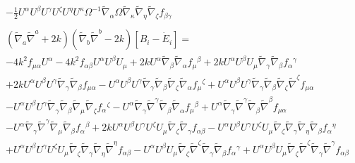 \documentclass[10pt,letterpaper]{article}
\numberwithin{equation}{section}
\begin{document}
\begin{eqnarray}
 && -  \tfrac{1}{2} U^{\alpha } U^{\beta } U^{\gamma } U^{\zeta } U^{\eta } U^{\kappa } \Omega^{-1} \tilde{\nabla}_{\alpha }\Omega \tilde{\nabla}_{\kappa }\tilde{\nabla}_{\eta }\tilde{\nabla}_{\zeta }f_{\beta \gamma }
\\ \nonumber\\
&&(\tilde\nabla_a\tilde\nabla^a +2 k)(\tilde\nabla_b\tilde\nabla^b-2k)[B_i -\dot E_i]=
\nonumber\\
&&-4 k^2 f_{\mu \alpha } U^{\alpha } - 4 k^2 f_{\alpha \beta } U^{\alpha } U^{\beta } U_{\mu } + 2 k U^{\alpha } \tilde{\nabla}_{\beta }\tilde{\nabla}_{\alpha }f_{\mu }{}^{\beta } + 2 k U^{\alpha } U^{\beta } U_{\mu } \tilde{\nabla}_{\gamma }\tilde{\nabla}_{\beta }f_{\alpha }{}^{\gamma } \nonumber \\ 
&& + 2 k U^{\alpha } U^{\beta } U^{\gamma } \tilde{\nabla}_{\gamma }\tilde{\nabla}_{\beta }f_{\mu \alpha } -  U^{\alpha } U^{\beta } U^{\gamma } \tilde{\nabla}_{\gamma }\tilde{\nabla}_{\beta }\tilde{\nabla}_{\zeta }\tilde{\nabla}_{\alpha }f_{\mu }{}^{\zeta } + U^{\alpha } U^{\beta } U^{\gamma } \tilde{\nabla}_{\gamma }\tilde{\nabla}_{\beta }\tilde{\nabla}_{\zeta }\tilde{\nabla}^{\zeta }f_{\mu \alpha } \nonumber \\ 
&& -  U^{\alpha } U^{\beta } U^{\gamma } \tilde{\nabla}_{\gamma }\tilde{\nabla}_{\beta }\tilde{\nabla}_{\mu }\tilde{\nabla}_{\zeta }f_{\alpha }{}^{\zeta } -  U^{\alpha } \tilde{\nabla}_{\gamma }\tilde{\nabla}^{\gamma }\tilde{\nabla}_{\beta }\tilde{\nabla}_{\alpha }f_{\mu }{}^{\beta } + U^{\alpha } \tilde{\nabla}_{\gamma }\tilde{\nabla}^{\gamma }\tilde{\nabla}_{\beta }\tilde{\nabla}^{\beta }f_{\mu \alpha } \nonumber \\ 
&& -  U^{\alpha } \tilde{\nabla}_{\gamma }\tilde{\nabla}^{\gamma }\tilde{\nabla}_{\mu }\tilde{\nabla}_{\beta }f_{\alpha }{}^{\beta } + 2 k U^{\alpha } U^{\beta } U^{\gamma } U^{\zeta } U_{\mu } \tilde{\nabla}_{\zeta }\tilde{\nabla}_{\gamma }f_{\alpha \beta } -  U^{\alpha } U^{\beta } U^{\gamma } U^{\zeta } U_{\mu } \tilde{\nabla}_{\zeta }\tilde{\nabla}_{\gamma }\tilde{\nabla}_{\eta }\tilde{\nabla}_{\beta }f_{\alpha }{}^{\eta } \nonumber \\ 
&& + U^{\alpha } U^{\beta } U^{\gamma } U^{\zeta } U_{\mu } \tilde{\nabla}_{\zeta }\tilde{\nabla}_{\gamma }\tilde{\nabla}_{\eta }\tilde{\nabla}^{\eta }f_{\alpha \beta } -  U^{\alpha } U^{\beta } U_{\mu } \tilde{\nabla}_{\zeta }\tilde{\nabla}^{\zeta }\tilde{\nabla}_{\gamma }\tilde{\nabla}_{\beta }f_{\alpha }{}^{\gamma } + U^{\alpha } U^{\beta } U_{\mu } \tilde{\nabla}_{\zeta }\tilde{\nabla}^{\zeta }\tilde{\nabla}_{\gamma }\tilde{\nabla}^{\gamma }f_{\alpha \beta } \nonumber \\ 

\end{eqnarray}
\end{document}
